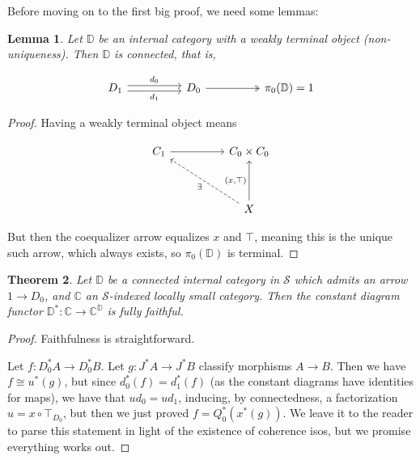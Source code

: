 \documentclass[10pt, oneside]{article}
\newtheorem{theorem}{Theorem}[section]
\newtheorem{lemma}[theorem]{Lemma}
\begin{document}
Before moving on to the first big proof, we need some lemmas:

\begin{lemma}
    Let $\mathbb{D}$ be an internal category with a weakly terminal object (non-uniqueness). Then $\mathbb{D}$ is connected, that is,

    \[\begin{tikzcd}[ampersand replacement=\&]
	{D_1} \&\& {D_0} \&\& {\pi_0(\mathbb{D}) = 1}
	\arrow["{d_0}", shift left, from=1-1, to=1-3]
	\arrow["{d_1}"', shift right, from=1-1, to=1-3]
	\arrow[two heads, from=1-3, to=1-5]
\end{tikzcd}\]
\end{lemma}
\begin{proof}
    Having a weakly terminal object means

    \[\begin{tikzcd}[ampersand replacement=\&]
	{C_1} \&\& {C_0 \times C_0} \\
	\\
	\&\& X
	\arrow["{(x, \top)}", from=3-3, to=1-3]
	\arrow["\exists", dashed, from=3-3, to=1-1]
	\arrow[from=1-1, to=1-3]
\end{tikzcd}\]

 But then the coequalizer arrow equalizes $x$ and $\top$, meaning this is the unique such arrow, which always exists, so $\pi_0(\mathbb{D})$ is terminal.
\end{proof}

\begin{theorem}
    Let $\mathbb{D}$ be a connected internal category in $\mathcal{S}$ which admits an arrow $1 \to D_0$, and $\mathbb{C}$ an $\mathcal{S}$-indexed locally small category. Then the constant diagram functor $\mathbb{D}^\ast: \mathbb{C} \to \mathbb{C}^\mathbb{D}$ is fully faithful.
\end{theorem}
\begin{proof}
    Faithfulness is straightforward.

    Let $f: D_0^\ast A \to D_0^\ast B$. Let $g: J^\ast A \to J^\ast B$ classify morphisms $A \to B$. Then we have $f \cong u^\ast (g)$, but since $d_0^\ast(f) = d_1^\ast(f)$ (as the constant diagrams have identities for maps), we have that $u d_0 = u d_1$, inducing, by connectedness, a factorization $u = x \circ \top_{D_0}$, but then we just proved $f = Q_0^\ast (x^\ast (g) )$. We leave it to the reader to parse this statement in light of the existence of coherence isos, but we promise everything works out.
\end{proof}
\end{document}
